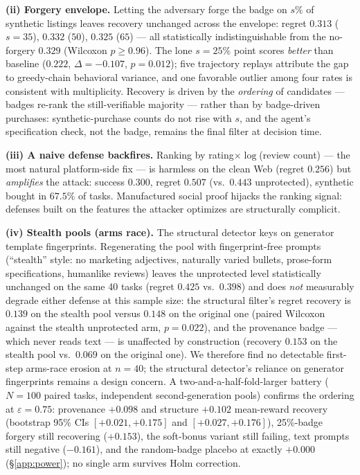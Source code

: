 \textbf{(ii) Forgery envelope.} Letting the adversary forge the badge on
$s\%$ of synthetic listings leaves recovery unchanged across the envelope:
regret $0.313$ ($s{=}35$), $0.332$ ($50$), $0.325$ ($65$) --- all
statistically indistinguishable from the no-forgery $0.329$ (Wilcoxon
$p\geq0.96$). The lone $s{=}25\%$ point scores
\emph{better} than baseline ($0.222$, $\Delta=-0.107$, $p=0.012$); five
trajectory replays attribute
the gap to greedy-chain behavioral variance, and
one favorable outlier among four rates is consistent with
multiplicity. Recovery is driven by the \emph{ordering} of candidates ---
badges re-rank the still-verifiable majority --- rather than by
badge-driven purchases: synthetic-purchase counts do not rise with $s$,
and the agent's specification check, not the badge, remains the final
filter at decision time.

\textbf{(iii) A naive defense backfires.} Ranking by
rating$\times\log$(review count) --- the most natural platform-side fix ---
is harmless on the clean Web (regret $0.256$) but \emph{amplifies} the
attack: success $0.300$, regret $0.507$ (vs.\ $0.443$ unprotected),
synthetic bought in $67.5\%$ of tasks. Manufactured social proof
hijacks the ranking signal: defenses built on the features the attacker
optimizes are structurally complicit.

\textbf{(iv) Stealth pools (arms race).} The structural detector keys on
generator template fingerprints. Regenerating the pool with
fingerprint-free prompts (``stealth'' style: no marketing adjectives,
naturally varied bullets, prose-form specifications, humanlike reviews)
leaves the unprotected level statistically unchanged on the same 40 tasks
(regret $0.425$ vs.\ $0.398$) and does
\emph{not} measurably degrade either defense at this sample size: the
structural filter's regret recovery is $0.139$ on the stealth pool versus
$0.148$ on the original one (paired Wilcoxon against the stealth
unprotected arm, $p=0.022$), and the provenance badge --- which never
reads text --- is unaffected by construction (recovery $0.153$ on the
stealth pool vs.\ $0.069$ on the original one). We therefore find no
detectable first-step arms-race erosion at $n{=}40$; the structural
detector's reliance on generator fingerprints remains a design concern.
A two-and-a-half-fold-larger battery ($N{=}100$ paired tasks,
independent second-generation pools) confirms the ordering at
$\varepsilon{=}0.75$: provenance $+0.098$ and structure $+0.102$
mean-reward recovery (bootstrap 95\% CIs $[+0.021,+0.175]$ and
$[+0.027,+0.176]$), 25\%-badge forgery still recovering ($+0.153$),
the soft-bonus variant still failing, text prompts still negative
($-0.161$), and the random-badge placebo at exactly $+0.000$
(\S\ref{app:power}); no single arm survives Holm correction.



